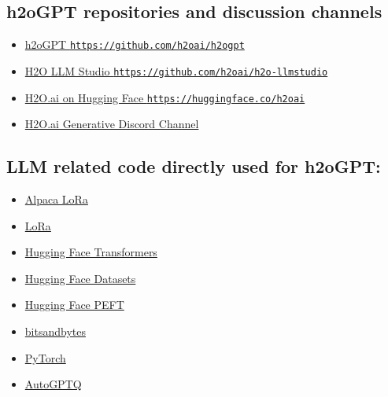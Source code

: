 \documentclass{article}
\begin{document}
\subsection*{h2oGPT repositories and discussion channels}
\begin{itemize}
\item \href{https://github.com/h2oai/h2ogpt}{\faGithubSquare h2oGPT \texttt{https://github.com/h2oai/h2ogpt}}
\item \href{https://github.com/h2oai/h2o-llmstudio}{\faGithubSquare H2O LLM Studio \texttt{https://github.com/h2oai/h2o-llmstudio}}
\item \href{https://huggingface.co/h2oai}{H2O.ai on Hugging Face \texttt{https://huggingface.co/h2oai}}
\item \href{https://discord.com/channels/1097462770674438174/1100717863221870643}{H2O.ai Generative Discord Channel}
\end{itemize}

\subsection*{LLM related code directly used for h2oGPT:}
\begin{itemize}
    \item \href{https://github.com/h2oai/alpaca-lora}{Alpaca LoRa}
    \item \href{https://github.com/microsoft/LoRA}{LoRa}
    \item \href{https://github.com/huggingface/transformers}{Hugging Face Transformers}
    \item \href{https://github.com/huggingface/datasets}{Hugging Face Datasets}
    \item \href{https://github.com/huggingface/peft}{Hugging Face PEFT}
    \item \href{https://github.com/TimDettmers/bitsandbytes}{bitsandbytes}
    \item \href{https://github.com/pytorch/pytorch}{PyTorch}
    \item \href{https://github.com/PanQiWei/AutoGPTQ}{AutoGPTQ}
\end{itemize}
\end{document}

